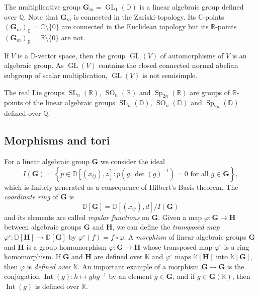 \documentclass[12pt]{amsart}
\newcommand{\R}{\mathbb{R} }
\newcommand{\Q}{\mathbb{Q} }
\newcommand{\C}{\mathbb{C} }
\newcommand{\D}{\mathbb{D} }
\newcommand{\K}{\mathbb{K}}
\newcommand{\SLnR}{\operatorname{SL}_n(\R) }
\newcommand{\SL}{\operatorname{SL} }
\newcommand{\bG}{\mathbf{G}}
\newcommand{\bH}{\mathbf{H}}
\numberwithin{equation}{section}
\theoremstyle{remark} %
\begin{document}
 The multiplicative group $\bG_m = \operatorname{GL}_1(\D)$ is a linear algebraic group defined over $\Q$. Note that $\bG_m$ is connected in the Zariski-topology. Its $\C$-points $(\bG_m)_\C = \C \setminus \{0\}$ are connected in the Euclidean topology but its $\R$-points $(\bG_m)_\R = \R \setminus \{0\}$ are not.
 
   If $V$ is a $\D$-vector space, then the group $\operatorname{GL}(V)$ of automorphisms of $V$ is an algebraic group. As $\operatorname{GL}(V)$ contains the closed connected normal abelian subgroup of scalar multiplication, $\operatorname{GL}(V)$ is not semisimple.  %
  
  The real Lie groups $\SLnR$, $\operatorname{SO}_n(\R)$ and $\operatorname{Sp}_{2n}(\R)$ are groups of $\R$-points of the linear algebraic groups $\SL_n(\D)$, $\operatorname{SO}_n(\D)$ and $\operatorname{Sp}_{2n}(\D)$ defined over $\Q$. 
  


 \subsection{Morphisms and tori }

For a linear algebraic group $\bG$ we consider the ideal 
$$
I(\bG) = \left\{p \in \D\left[\left(x_{ij}\right),z\right] \colon  p\left(g,\det\!\left(g\right)^{-1}\right) = 0 \text{ for all } g \in \bG   \right\},
$$
which is finitely generated as a consequence of Hilbert's Basis theorem. The \emph{coordinate ring} of $\bG$ is 
$$
\D [\bG] = \D\left[\left(x_{ij}\right),d\right] / I(\bG)
$$
and its elements are called \emph{regular functions} on $\bG$. Given a map $\varphi\colon \bG \to \bH$ between algebraic groups $\bG$ and $\bH$, we can define the \emph{transposed map} $\varphi^\circ \colon \D[\bH] \to \D[\bG]$ by $\varphi^\circ (f) = f \circ \varphi$. A \emph{morphism} of linear algebraic groups $\bG$ and $\bH$ is a group homomorphism $\varphi \colon \bG \to \bH$ whose transposed map $\varphi^\circ$ is a ring homomorphism. If $\bG$ and $\bH$ are defined over $\K$ and $\varphi^\circ$ maps $\K[\bH]$ into $\K[\bG]$, then $\varphi$ is \emph{defined over} $\K$. An important example of a morphism $\bG \to \bG$ is the conjugation $\operatorname{Int}(g) \colon h \mapsto ghg^{-1}$ by an element $g \in \bG$, and if $g \in \bG(\K)$, then $\operatorname{Int}(g)$ is defined over $\K$.
\end{document}
